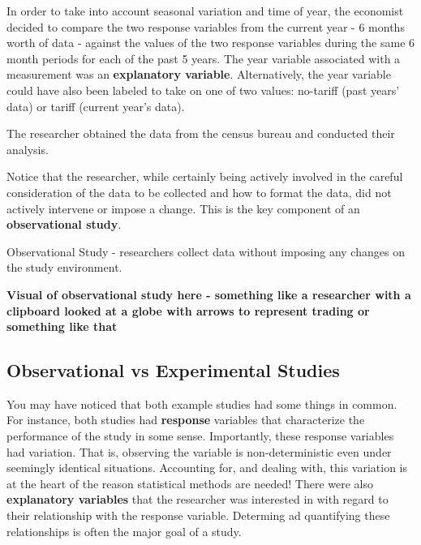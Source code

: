 \documentclass[
]{book}
\theoremstyle{definition}
\theoremstyle{definition}
\theoremstyle{definition}
\theoremstyle{remark}
\let\BeginKnitrBlock\begin \let\EndKnitrBlock\end
\begin{document}
In order to take into account seasonal variation and time of year, the economist decided to compare the two response variables from the current year - 6 months worth of data - against the values of the two response variables during the same 6 month periods for each of the past 5 years. The year variable associated with a measurement was an \textbf{explanatory variable}. Alternatively, the year variable could have also been labeled to take on one of two values: no-tariff (past years' data) or tariff (current year's data).

The researcher obtained the data from the census bureau and conducted their analysis.

Notice that the researcher, while certainly being actively involved in the careful consideration of the data to be collected and how to format the data, did not actively intervene or impose a change. This is the key component of an \textbf{observational study}.

\BeginKnitrBlock{definition}
Observational Study - researchers collect data without imposing any changes on the study environment.
\EndKnitrBlock{definition}

\textbf{Visual of observational study here - something like a researcher with a clipboard looked at a globe with arrows to represent trading or something like that}

\hypertarget{observational-vs-experimental-studies}{%
\subsection{Observational vs Experimental Studies}\label{observational-vs-experimental-studies}}

You may have noticed that both example studies had some things in common. For instance, both studies had \textbf{response} variables that characterize the performance of the study in some sense. Importantly, these response variables had variation. That is, observing the variable is non-deterministic even under seemingly identical situations. Accounting for, and dealing with, this variation is at the heart of the reason statistical methods are needed! There were also \textbf{explanatory variables} that the researcher was interested in with regard to their relationship with the response variable. Determing ad quantifying these relationships is often the major goal of a study.
\end{document}
